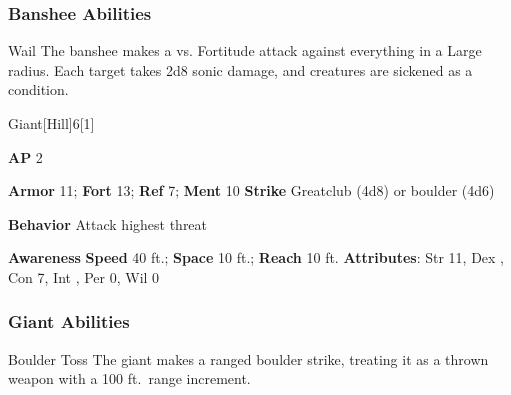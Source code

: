 \subsubsection{Banshee Abilities}

\begin{freeability}{Wail}
The banshee makes a  vs. Fortitude attack against everything in a Large radius.
\hit Each target takes 2d8 sonic damage, and creatures are sickened as a condition.
\end{freeability}

\begin{monsection}{Giant}[Hill]{6}[1]
\vspace{-1em}\vspace{-1em}
\begin{spellcontent}
\begin{spelltargetinginfo}
{\textbf{AP} 2}

\pari \textbf{Armor} 11;
\textbf{Fort} 13;
\textbf{Ref} 7;
\textbf{Ment} 10
\pari \textbf{Strike} Greatclub  (4d8) or boulder  (4d6)



\pari \textbf{Behavior} Attack highest threat
\end{spelltargetinginfo}
\end{spellcontent}

\begin{monsterfooter}
\pari \textbf{Awareness} 
\pari \textbf{Speed} 40 ft.;
\textbf{Space} 10 ft.;
\textbf{Reach} 10 ft.
\pari \textbf{Attributes}:
Str 11,
Dex ,
Con 7,
Int ,
Per 0,
Wil 0
\end{monsterfooter}
\end{monsection}


\subsubsection{Giant Abilities}

\begin{freeability}{Boulder Toss}
The giant makes a ranged boulder strike, treating it as a thrown weapon with a 100 ft.\ range increment.
\end{freeability}

